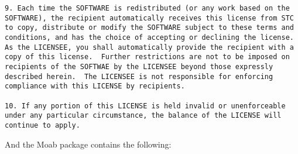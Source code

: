 \begin{verbatim}
9. Each time the SOFTWARE is redistributed (or any work based on the
SOFTWARE), the recipient automatically receives this license from STC
to copy, distribute or modify the SOFTWARE subject to these terms and
conditions, and has the choice of accepting or declining the license.
As the LICENSEE, you shall automatically provide the recipient with a
copy of this license.  Further restrictions are not to be imposed on
recipients of the SOFTWAE by the LICENSEE beyond those expressly
described herein.  The LICENSEE is not responsible for enforcing
compliance with this LICENSE by recipients.

10. If any portion of this LICENSE is held invalid or unenforceable
under any particular circumstance, the balance of the LICENSE will
continue to apply.  \end{verbatim}

And the Moab package contains the following:

